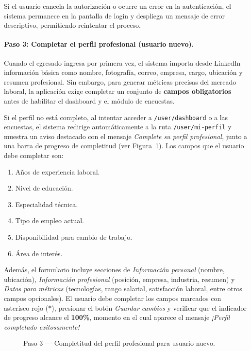 Si el usuario cancela la autorización o ocurre un error en la autenticación, el sistema permanece en la pantalla de login y despliega un mensaje de error descriptivo, permitiendo reintentar el proceso.

\paragraph{Paso 3: Completar el perfil profesional (usuario nuevo).}

Cuando el egresado ingresa por primera vez, el sistema importa desde LinkedIn información básica como nombre, fotografía, correo, empresa, cargo, ubicación y resumen profesional. Sin embargo, para generar métricas precisas del mercado laboral, la aplicación exige completar un conjunto de \textbf{campos obligatorios} antes de habilitar el dashboard y el módulo de encuestas.

Si el perfil no está completo, al intentar acceder a \texttt{/user/dashboard} o a las encuestas, el sistema redirige automáticamente a la ruta \texttt{/user/mi-perfil} y muestra un aviso destacado con el mensaje \emph{Complete su perfil profesional}, junto a una barra de progreso de completitud (ver Figura~\ref{fig:login-egresado-paso3}). Los campos que el usuario debe completar son:

\begin{enumerate}
\item Años de experiencia laboral.
\item Nivel de educación.
\item Especialidad técnica.
\item Tipo de empleo actual.
\item Disponibilidad para cambio de trabajo.
\item Área de interés.
\end{enumerate}

Además, el formulario incluye secciones de \emph{Información personal} (nombre, ubicación), \emph{Información profesional} (posición, empresa, industria, resumen) y \emph{Datos para métricas} (tecnologías, rango salarial, satisfacción laboral, entre otros campos opcionales). El usuario debe completar los campos marcados con asterisco rojo ($*$), presionar el botón \emph{Guardar cambios} y verificar que el indicador de progreso alcance el \textbf{100\%}, momento en el cual aparece el mensaje \emph{¡Perfil completado exitosamente!}

\begin{figure}[H]
\centering
{}
\caption{Paso 3 --- Completitud del perfil profesional para usuario nuevo.}
\label{fig:login-egresado-paso3}
\end{figure}

